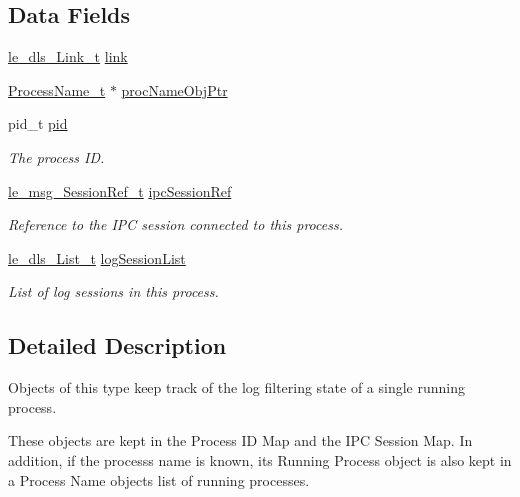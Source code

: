 \subsection*{Data Fields}
\begin{DoxyCompactItemize}
\item 
\hyperlink{structle__dls___link__t}{le\+\_\+dls\+\_\+\+Link\+\_\+t} \hyperlink{struct_running_process__t_af39d18d2d787b0348591a3a6f1b63da0}{link}
\item 
\hyperlink{struct_process_name__t}{Process\+Name\+\_\+t} $\ast$ \hyperlink{struct_running_process__t_aef73f3e1f47942b50a13fc5b7fd0660e}{proc\+Name\+Obj\+Ptr}
\item 
pid\+\_\+t \hyperlink{struct_running_process__t_aaba42a3a261c073524f65bb8b256b76e}{pid}
\begin{DoxyCompactList}\small\item\em The process ID. \end{DoxyCompactList}\item 
\hyperlink{le__messaging_8h_aebfc01e15b430a5b4f3038a5bd518904}{le\+\_\+msg\+\_\+\+Session\+Ref\+\_\+t} \hyperlink{struct_running_process__t_aecf1049729d113bc5f8a68076d7f357c}{ipc\+Session\+Ref}
\begin{DoxyCompactList}\small\item\em Reference to the I\+PC session connected to this process. \end{DoxyCompactList}\item 
\hyperlink{structle__dls___list__t}{le\+\_\+dls\+\_\+\+List\+\_\+t} \hyperlink{struct_running_process__t_a831478af4823c8cb1e08228edd5fc98b}{log\+Session\+List}
\begin{DoxyCompactList}\small\item\em List of log sessions in this process. \end{DoxyCompactList}\end{DoxyCompactItemize}


\subsection{Detailed Description}
Objects of this type keep track of the log filtering state of a single running process.

These objects are kept in the Process ID Map and the I\+PC Session Map. In addition, if the process\textquotesingle{}s name is known, its Running Process object is also kept in a Process Name object\textquotesingle{}s list of running processes. 


